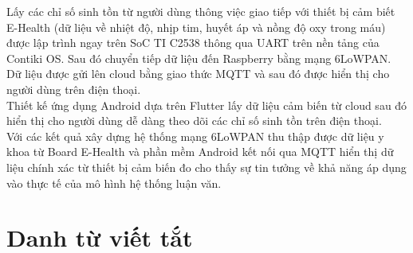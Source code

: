 \documentclass{report}
\begin{document}
\large{Lấy các chỉ số sinh tồn từ người dùng thông việc giao tiếp với thiết bị cảm biết E-Health (dữ liệu về nhiệt độ, nhịp tim, huyết áp và nồng độ oxy trong máu) được lập trình ngay trên SoC TI C2538 thông qua UART trên nền tảng của Contiki OS. Sau đó chuyển tiếp dữ liệu đến Raspberry bằng mạng 6LoWPAN. Dữ liệu được gửi lên cloud bằng giao thức MQTT và sau đó được hiển thị cho người dùng trên điện thoại.} \\

\large{Thiết kế ứng dụng Android dựa trên Flutter lấy dữ liệu cảm biến từ cloud sau đó hiển thị cho người dùng dễ dàng theo dõi các chỉ số sinh tồn trên điện thoại.}  \\

\large{Với các kết quả xây dựng hệ thống mạng 6LoWPAN thu thập được dữ liệu y khoa từ Board E-Health và phần mềm Android kết nối qua MQTT hiển thị dữ liệu chính xác từ thiết bị cảm biến đo cho thấy sự tin tưởng về khả năng áp dụng vào thực tế của mô hình hệ thống luận văn.}

\newpage
\tableofcontents


\chapter*{\huge Danh từ viết tắt} 
\end{document}

